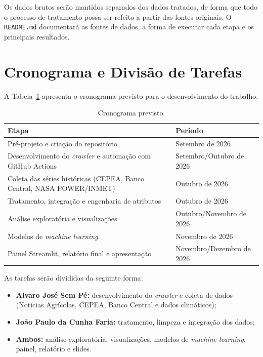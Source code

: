 \documentclass{article}
\begin{document}
Os dados brutos serão mantidos separados dos dados tratados, de forma que todo o processo de tratamento
possa ser refeito a partir das fontes originais. O \texttt{README.md} documentará as fontes de dados, a
forma de executar cada etapa e os principais resultados.


\section{Cronograma e Divisão de Tarefas}

A Tabela~\ref{tab:cronograma} apresenta o cronograma previsto para o desenvolvimento do trabalho.

\begin{table}[H]
      \centering
      \small
      \caption{Cronograma previsto.}
      \label{tab:cronograma}
      \begin{tabularx}{\textwidth}{>{\raggedright\arraybackslash}X >{\raggedright\arraybackslash}p{4.5cm}}
            \toprule
            \textbf{Etapa}                                                        & \textbf{Período}        \\
            \midrule
            Pré-projeto e criação do repositório                                  & Setembro de 2026        \\
            Desenvolvimento do \textit{crawler} e automação com GitHub Actions    & Setembro/Outubro de 2026 \\
            Coleta das séries históricas (CEPEA, Banco Central, NASA POWER/INMET) & Outubro de 2026         \\
            Tratamento, integração e engenharia de atributos                      & Outubro de 2026         \\
            Análise exploratória e visualizações                                  & Outubro/Novembro de 2026 \\
            Modelos de \textit{machine learning}                                  & Novembro de 2026        \\
            Painel Streamlit, relatório final e apresentação                      & Novembro/Dezembro de 2026 \\
            \bottomrule
      \end{tabularx}
\end{table}

As tarefas serão divididas da seguinte forma:

\begin{itemize}
      \item \textbf{Alvaro José Sem Pé:} desenvolvimento do \textit{crawler} e coleta de dados (Notícias
            Agrícolas, CEPEA, Banco Central e dados climáticos);
      \item \textbf{João Paulo da Cunha Faria:} tratamento, limpeza e integração dos dados;
      \item \textbf{Ambos:} análise exploratória, visualizações, modelos de \textit{machine learning},
            painel, relatório e slides.
\end{itemize}
\end{document}

